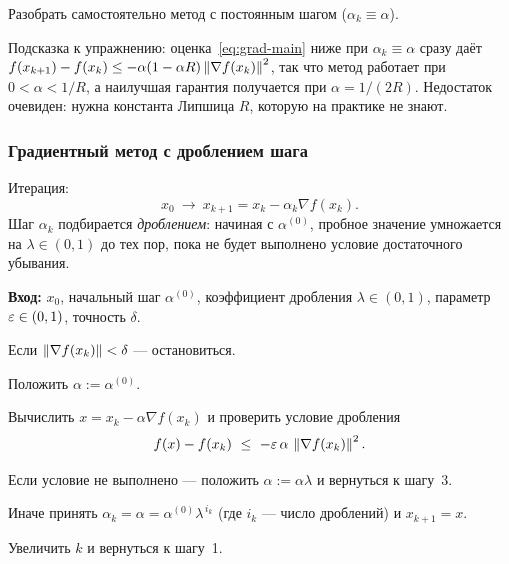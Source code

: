 \begin{exercise}
Разобрать самостоятельно метод с постоянным шагом ($\alpha_k \equiv \alpha$).
\end{exercise}

\begin{idea}
Подсказка к упражнению: оценка~\eqref{eq:grad-main} ниже при $\alpha_k \equiv
\alpha$ сразу даёт
$f(x_{k+1}) - f(x_k) \le -\alpha(1-\alpha R)\left\lVert \nabla f(x_k) \right\rVert^2$, так что
метод работает при $0 < \alpha < 1/R$, а наилучшая гарантия получается при
$\alpha = 1/(2R)$. Недостаток очевиден: нужна константа Липшица $R$, которую
на практике не знают.
\end{idea}

\subsubsection*{Градиентный метод с дроблением шага}

Итерация:
\[
  x_0 \ \longrightarrow\ x_{k+1} = x_k - \alpha_k \nabla f(x_k) .
\]
Шаг $\alpha_k$ подбирается \emph{дроблением}: начиная с $\alpha^{(0)}$,
пробное значение умножается на $\lambda \in (0,1)$ до тех пор, пока не будет
выполнено условие достаточного убывания.

\begin{algo}[title={Градиентный метод с дроблением шага}]
\textbf{Вход:} $x_0$, начальный шаг $\alpha^{(0)}$, коэффициент дробления
$\lambda \in (0,1)$, параметр $\varepsilon \in (0,1)$, точность $\delta$.

\begin{steps}
  \item Если $\left\lVert \nabla f(x_k) \right\rVert < \delta$ — остановиться.
  \item Положить $\alpha := \alpha^{(0)}$.
  \item Вычислить $x = x_k - \alpha \nabla f(x_k)$ и проверить условие
        дробления
        \[
          f(x) - f(x_k) \ \le\ -\varepsilon\,\alpha\, \left\lVert \nabla f(x_k) \right\rVert^2 .
        \]
  \item Если условие не выполнено — положить $\alpha := \alpha\lambda$ и
        вернуться к шагу~3.
  \item Иначе принять
        $\alpha_k = \alpha = \alpha^{(0)}\lambda^{\,i_k}$ (где $i_k$ — число
        дроблений) и $x_{k+1} = x$.
  \item Увеличить $k$ и вернуться к шагу~1.
\end{steps}
\end{algo}


